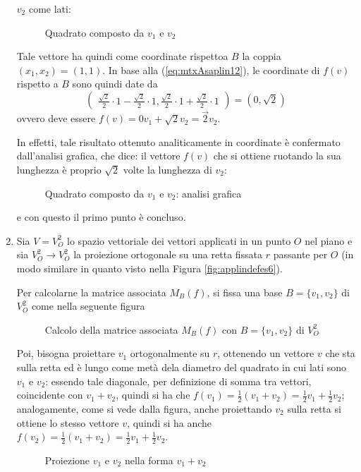 \begin{es}
\begin{enumerate}
    $v_2$ come lati:
    \clearpage
    \begin{figure}[ht!]
      \centering
      \resizebox{5cm}{!}{}
      \caption{Quadrato composto da $v_1$ e $v_2$}
      \label{fig:mtxAsaplin4}
    \end{figure}
    Tale vettore ha quindi come coordinate rispettoa $B$ la coppia $(x_1,x_2)=(1,1)$.
    In base alla (\ref{eq:mtxAsaplin12}), le coordinate di $f(v)$ rispetto a $B$ sono
    quindi date da
    \begin{equation*}
      \begin{pmatrix}
        \frac{\sqrt{2}}{2}\cdot 1 - \frac{\sqrt{2}}{2} \cdot 1,
        \frac{\sqrt{2}}{2} \cdot 1 + \frac{\sqrt{2}}{2}\cdot 1
      \end{pmatrix}
      =(0,\sqrt{2})
    \end{equation*}
    ovvero deve essere $f(v)=0v_1+\sqrt{2}v_2=\vec{2}v_2$.

    In effetti, tale risultato ottenuto analiticamente in coordinate è confermato
    dall'analisi grafica, che dice: il vettore $f(v)$ che si ottiene ruotando la
    sua lunghezza è proprio $\sqrt{2}$ volte la lunghezza di $v_2$:
    \begin{figure}[ht!]
      \centering
      \resizebox{5cm}{!}{}
      \caption{Quadrato composto da $v_1$ e $v_2$: analisi grafica}
      \label{fig:mtxAsaplin4-1}
    \end{figure}
    
    e con questo il primo punto è concluso.
  \item Sia $V=V_O^2$ lo spazio vettoriale dei vettori applicati in un punto $O$
    nel piano e sia $V_O^2\to V_O^2$ la proiezione ortogonale su una retta fissata
    $r$ passante per $O$ (in modo similare in quanto visto nella Figura \ref{fig:applindefes6}).

    Per calcolarne la matrice associata $M_B(f)$, si fissa una base $B=\{v_1,v_2\}$ di $V_O^2$
    come nella seguente figura
    \begin{figure}[ht!]
      \centering
      \resizebox{5cm}{!}{}
      \caption{Calcolo della matrice associata $M_B(f)$ con $B=\{v_1,v_2\}$ di $V_O^2$}
      \label{fig:mtxAsaplin5}
    \end{figure}

    Poi, bisogna proiettare $v_1$ ortogonalmente su $r$, ottenendo un vettore $v$ che
    sta sulla retta ed è lungo come metà dela diametro del quadrato in cui lati sono
    $v_1$ e $v_2$: essendo tale diagonale, per definizione di somma tra vettori,
    coincidente con $v_1+v_2$, quindi si ha che $f(v_1)=\frac{1}{2}(v_1+v_2)=
    \frac{1}{2}v_1+\frac{1}{2}v_2$; analogamente, come si vede dalla figura, anche
    proiettando $v_2$ sulla retta si ottiene lo stesso vettore $v$, quindi si ha
    anche $f(v_2)=\frac{1}{2}(v_1+v_2)=\frac{1}{2}v_1+\frac{1}{2}v_2$.
    \begin{figure}[ht!]
      \centering
      \resizebox{5cm}{!}{}
      \caption{Proiezione $v_1$ e $v_2$ nella forma $v_1+v_2$ }
      \label{fig:mtxAsaplin6}
    \end{figure}
    

\end{enumerate}
\end{es}
